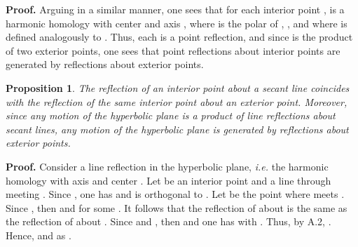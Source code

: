 \documentclass[a4paper,twoside,12pt]{article}
\newtheorem{prop}{Proposition}[section]
\newenvironment{proof}{\medskip \noindent 
            {\bf Proof.}}{ \hfill \myHighlight{$\square$}\coordHE{} \medskip}
\begin{document}
\begin{proof} Arguing in a similar manner, one sees that for each 
interior point \coordHE{}, \coordHE{} is a harmonic homology with center 
\coordHE{} and axis \coordHE{}, where \coordHE{} is the polar of \coordHE{},
\coordHE{}, and where \coordHE{} is defined analogously to 
\coordHE{}. Thus, each \coordHE{} is a point reflection, and since 
\coordHE{} is the product of two exterior points, one sees that point reflections 
about interior points are generated by reflections about exterior points.
\end{proof}

\begin{prop} The reflection of an interior point about a secant
line coincides with the reflection of the same interior point about 
an exterior point. Moreover, since any motion of the hyperbolic plane 
is a product of line reflections about secant lines, any motion of the 
hyperbolic plane is generated by reflections about exterior points.
\end{prop}

\begin{proof} Consider a line reflection in the hyperbolic plane, {\it i.e.}
the harmonic homology with axis \coordHE{} and center \coordHE{}. Let \coordHE{}
be an interior point and \coordHE{} a line through \coordHE{} meeting \coordHE{}.
Since \coordHE{}, one has \coordHE{} and \coordHE{} is orthogonal to \coordHE{}.
Let \coordHE{} be the point where \coordHE{} meets \coordHE{}. Since \coordHE{},
then \coordHE{} and \coordHE{} for some \coordHE{}. It follows
that the reflection of \coordHE{} about \coordHE{} is the same as the reflection
of \coordHE{} about \coordHE{}. Since \coordHE{} and \coordHE{}, then \coordHE{} and
one has \coordHE{} with \coordHE{}. Thus, by A.2, \coordHE{}. Hence,
\coordHE{} and \coordHE{} as \coordHE{}.
\end{proof}
\end{document}
